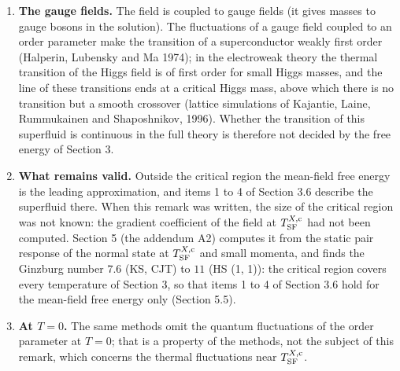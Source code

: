 \documentclass[
  10pt,
]{article}
\providecommand{\tightlist}{%
  \setlength{\itemsep}{0pt}\setlength{\parskip}{0pt}}
\begin{document}
\begin{enumerate}
  \begin{itemize}
  \tightlist
  \item
    the order parameter vanishes with an exponent different from the
    \(\tfrac12\) of item 1 of Section 3.6 (in three dimensions this
    exponent is near \(0.33\) to \(0.37\) for the Ising, \(XY\) and
    Heisenberg universality classes);
  \item
    the critical temperature is in general lower than the mean-field one
    (the fluctuations disorder the field);
  \item
    for an order parameter with two quartic invariants, as here
    (\(\lvert\vec\Phi\rvert^4\) and
    \(\lvert\vec\Phi\cdot\vec\Phi\rvert^2\)), the fluctuations can also
    make the transition discontinuous (of first order); the
    renormalization-group theory of such fields is reviewed by
    Pelissetto and Vicari (2002).
  \end{itemize}
\item
  \textbf{The gauge fields.} The field is coupled to gauge fields (it
  gives masses to gauge bosons in the solution). The fluctuations of a
  gauge field coupled to an order parameter make the transition of a
  superconductor weakly first order (Halperin, Lubensky and Ma 1974); in
  the electroweak theory the thermal transition of the Higgs field is of
  first order for small Higgs masses, and the line of these transitions
  ends at a critical Higgs mass, above which there is no transition but
  a smooth crossover (lattice simulations of Kajantie, Laine,
  Rummukainen and Shaposhnikov, 1996). Whether the transition of this
  superfluid is continuous in the full theory is therefore not decided
  by the free energy of Section 3.
\item
  \textbf{What remains valid.} Outside the critical region the
  mean-field free energy is the leading approximation, and items 1 to 4
  of Section 3.6 describe the superfluid there. When this remark was
  written, the size of the critical region was not known: the gradient
  coefficient of the field at \(T^{X,{\rm c}}_{\rm SF}\) had not been
  computed. Section 5 (the addendum A2) computes it from the static pair
  response of the normal state at \(T^{X,{\rm c}}_{\rm SF}\) and small
  momenta, and finds the Ginzburg number \(7.6\) (KS, CJT) to \(11\) (HS
  (1, 1)): the critical region covers every temperature of Section 3, so
  that items 1 to 4 of Section 3.6 hold for the mean-field free energy
  only (Section 5.5).
\item
  \textbf{At \(T=0\).} The same methods omit the quantum fluctuations of
  the order parameter at \(T=0\); that is a property of the methods, not
  the subject of this remark, which concerns the thermal fluctuations
  near \(T^{X,{\rm c}}_{\rm SF}\).
\end{enumerate}
\end{document}
